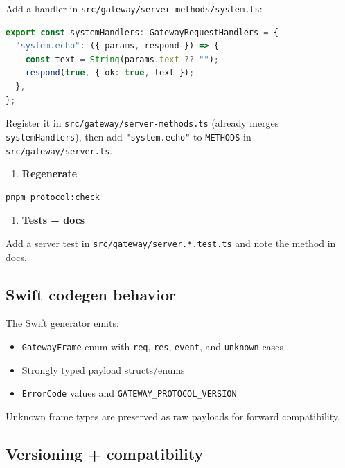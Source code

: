 Add a handler in \texttt{src/gateway/server-methods/system.ts}:

\begin{lstlisting}[language=typescript]
export const systemHandlers: GatewayRequestHandlers = {
  "system.echo": ({ params, respond }) => {
    const text = String(params.text ?? "");
    respond(true, { ok: true, text });
  },
};
\end{lstlisting}


Register it in \texttt{src/gateway/server-methods.ts} (already merges \texttt{systemHandlers}),
then add \texttt{"system.echo"} to \texttt{METHODS} in \texttt{src/gateway/server.ts}.

\begin{enumerate}
  \item \textbf{Regenerate}
\end{enumerate}


\begin{lstlisting}[language=bash]
pnpm protocol:check
\end{lstlisting}


\begin{enumerate}
  \item \textbf{Tests + docs}
\end{enumerate}


Add a server test in \texttt{src/gateway/server.*.test.ts} and note the method in docs.

\subsection{Swift codegen behavior}


The Swift generator emits:

\begin{itemize}
  \item \texttt{GatewayFrame} enum with \texttt{req}, \texttt{res}, \texttt{event}, and \texttt{unknown} cases
  \item Strongly typed payload structs/enums
  \item \texttt{ErrorCode} values and \texttt{GATEWAY\_PROTOCOL\_VERSION}
\end{itemize}


Unknown frame types are preserved as raw payloads for forward compatibility.

\subsection{Versioning + compatibility}


